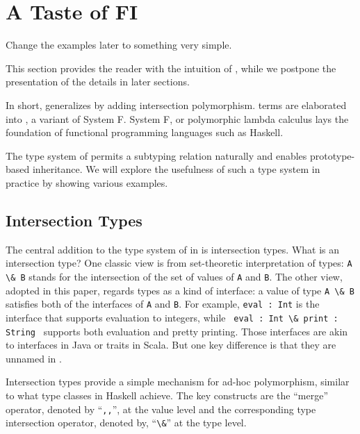 \section{A Taste of FI}

\begin{footnote}
  Change the examples later to something very simple.
\end{footnote}

This section provides the reader with the intuition of \systemFI, while we postpone
the presentation of the details in later sections.

In short, \systemfi generalizes \systemf by adding intersection polymorphism. \systemfi terms
are elaborated into \systemF, a variant of System F. System F, or polymorphic
lambda calculus lays the foundation of functional programming languages such as
Haskell.

The type system of \systemfi permits a subtyping relation naturally and enables
prototype-based inheritance. We will explore the usefulness of such a type
system in practice by showing various examples.

\subsection{Intersection Types}

The central addition to the type system of \systemf in \systemfi is intersection types. What
is an intersection type? One classic view is from set-theoretic interpretation
of types: \lstinline{A \& B} stands for the intersection of the set of values of
\lstinline{A} and \lstinline{B}. The other view, adopted in this paper, regards
types as a kind of interface: a value of type \lstinline{A \& B} satisfies both
of the interfaces of \lstinline{A} and \lstinline{B}. For example,
\lstinline{eval : Int} is the interface that supports evaluation to integers,
while \lstinline{ eval : Int \& print : String } supports both evaluation and
pretty printing. Those interfaces are akin to interfaces in Java or traits in
Scala. But one key difference is that they are unnamed in \systemFI.

Intersection types provide a simple mechanism for ad-hoc polymorphism, similar
to what type classes in Haskell achieve. The key constructs are the ``merge''
operator, denoted by ``\lstinline{,,}'', at the value level and the corresponding type
intersection operator, denoted by, ``\lstinline{\&}'' at the type level.

